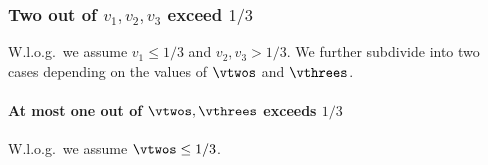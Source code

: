 











\subsubsection{Two out of \texorpdfstring{$v_1,v_2,v_3$}{v1, v2, v3} exceed \texorpdfstring{$1/3$}{1/3}}
W.l.o.g.~we assume $v_1\le1/3$ and $v_2,v_3>1/3$. We further subdivide into two cases depending on the values of $\vtwos$ and $\vthrees$.

\paragraph{At most one out of $\vtwos,\vthrees$ exceeds $1/3$}
W.l.o.g.~we assume $\vtwos \le 1/3$.

